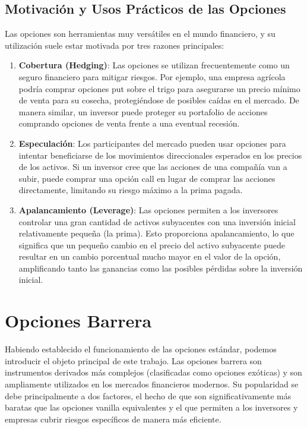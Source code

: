 \subsection{Motivación y Usos Prácticos de las Opciones}

Las opciones son herramientas muy versátiles en el mundo financiero, y su utilización suele estar motivada por tres razones principales:

\begin{enumerate}
    \item \textbf{Cobertura (Hedging)}: Las opciones se utilizan frecuentemente como un seguro financiero para mitigar riesgos. Por ejemplo, una empresa agrícola podría comprar opciones put sobre el trigo para asegurarse un precio mínimo de venta para su cosecha, protegiéndose de posibles caídas en el mercado. De manera similar, un inversor puede proteger su portafolio de acciones comprando opciones de venta frente a una eventual recesión.
    
    \item \textbf{Especulación}: Los participantes del mercado pueden usar opciones para intentar beneficiarse de los movimientos direccionales esperados en los precios de los activos. Si un inversor cree que las acciones de una compañía van a subir, puede comprar una opción call en lugar de comprar las acciones directamente, limitando su riesgo máximo a la prima pagada.
    
    \item \textbf{Apalancamiento (Leverage)}: Las opciones permiten a los inversores controlar una gran cantidad de activos subyacentes con una inversión inicial relativamente pequeña (la prima). Esto proporciona apalancamiento, lo que significa que un pequeño cambio en el precio del activo subyacente puede resultar en un cambio porcentual mucho mayor en el valor de la opción, amplificando tanto las ganancias como las posibles pérdidas sobre la inversión inicial.
\end{enumerate}

\section{Opciones Barrera}

Habiendo establecido el funcionamiento de las opciones estándar, podemos introducir el objeto principal de este trabajo. Las opciones barrera son instrumentos derivados más complejos (clasificadas como opciones exóticas) y son ampliamente utilizados en los mercados financieros modernos. Su popularidad se debe principalmente a dos factores, el hecho de que son significativamente más baratas que las opciones vanilla equivalentes y el que permiten a los inversores y empresas cubrir riesgos específicos de manera más eficiente.

